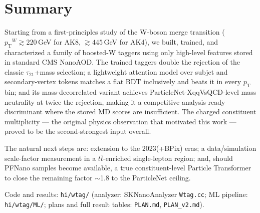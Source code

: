 \documentclass[11pt,a4paper]{article}
\newcommand{\pt}{\ensuremath{p_{\mathrm{T}}}}
\begin{document}
\section{Summary}

Starting from a first-principles study of the W-boson merge transition
($\pt^{W}\gtrsim 220\,$GeV for AK8, $\gtrsim 445\,$GeV for AK4), we built,
trained, and characterized a family of boosted-W taggers using only
high-level features stored in standard CMS NanoAOD. The trained taggers
double the rejection of the classic $\tau_{21}$+mass selection; a
lightweight attention model over subjet and secondary-vertex tokens matches
a flat BDT inclusively and beats it in every \pt{} bin; and its
mass-decorrelated variant achieves ParticleNet-XqqVsQCD-level mass
neutrality at twice the rejection, making it a competitive analysis-ready
discriminant where the stored MD scores are insufficient. The charged
constituent multiplicity --- the original physics observation that
motivated this work --- proved to be the second-strongest input overall.

The natural next steps are: extension to the 2023(+BPix) eras; a
data/simulation scale-factor measurement in a $t\bar t$-enriched single-lepton
region; and, should PFNano samples become available, a true
constituent-level Particle Transformer to close the remaining factor
$\sim$1.8 to the ParticleNet ceiling.

\vspace{1em}
\noindent\small
Code and results: \texttt{hi/wtag/} (analyzer: SKNanoAnalyzer
\texttt{Wtag.cc}; ML pipeline: \texttt{hi/wtag/ML/}; plans and full result
tables: \texttt{PLAN.md}, \texttt{PLAN\_v2.md}).
\end{document}
